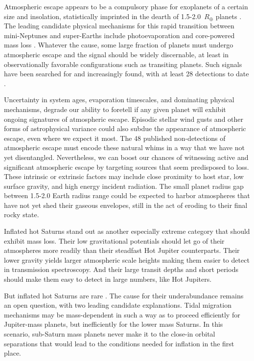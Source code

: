 \documentclass[twocolumn]{aastex631}
\begin{document}
Atmospheric escape appears to be a compulsory phase for exoplanets of a certain size and insolation, statistically imprinted in the dearth of 1.5-2.0~$R_\oplus$ planets \citep{2017AJ....154..109F}.  The leading candidate physical mechanisms for this rapid transition between mini-Neptunes and super-Earths include photoevaporation \citep{2013ApJ...775..105O,2017ApJ...847...29O} and core-powered mass loss \citep{2019MNRAS.487...24G}.  Whatever the cause, some large fraction of planets must undergo atmospheric escape and the signal should be widely discernable, at least in observationally favorable configurations such as transiting planets.  Such signals have been searched for and increasingly found, with at least 28 detections to date \citep{2022arXiv221116243D}.

Uncertainty in system ages, evaporation timescales, and dominating physical mechanisms, degrade our ability to foretell if any given planet will exhibit ongoing signatures of atmospheric escape.  Episodic stellar wind gusts and other forms of astrophysical variance could also subdue the appearance of atmospheric escape, even where we expect it most.  The 48 published non-detections of atmospheric escape \citep{2022arXiv221116243D} must encode these natural whims in a way that we have not yet disentangled. Nevertheless, we can boost our chances of witnessing active and significant atmospheric escape by targeting sources that seem predisposed to loss.  These intrinsic or extrinsic factors may include close proximity to host star, low surface gravity, and high energy incident radiation.  The small planet radius gap between 1.5-2.0 Earth radius range could be expected to harbor atmospheres that have not yet shed their gaseous envelopes, still in the act of eroding to their final rocky state.

Inflated hot Saturns stand out as another especially extreme category that should exhibit mass loss.  Their low gravitational potentials should let go of their atmospheres more readily than their steadfast Hot Jupiter counterparts.  Their lower gravity yields larger atmospheric scale heights making them easier to detect in transmission spectroscopy.  And their large transit depths and short periods should make them easy to detect in large numbers, like Hot Jupiters.

But inflated hot Saturns are rare \citep{2018AJ....155..214T}.  The cause for their underabundance remains an open question, with two leading candidate explanations.  Tidal migration mechanisms may be mass-dependent in such a way as to proceed efficiently for Jupiter-mass planets, but inefficiently for the lower mass Saturns.  In this scenario, sub-Saturn mass planets never make it to the close-in orbital separations that would lead to the conditions needed for inflation in the first place.
\end{document}
